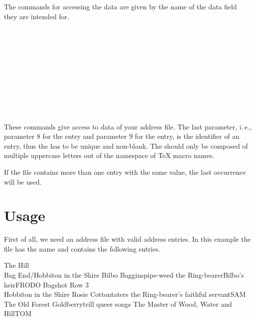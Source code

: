The commands for accessing the data are given by the name of the data
field they are intended for.
\begin{Declaration}
  \\
  \\
  \\
  \\
  \\
  \\
  \\
  \\
  \\
\end{Declaration}%
%
%
%
%
These commands give access to data of your address file.  The last
parameter, i.\,e., parameter 8 for the  entry and
parameter 9 for the  entry, is the identifier of an
entry, thus the  has to be unique and non-blank. The
 should only be composed of multiple uppercase letters out of the
namespace of \TeX{} macro names.

If the file contains more than one entry with the same 
value, the last occurrence will be used.%
%
%
%
%
%
%


\section{Usage}

First of all, we need an address file with valid address entries.  In
this example the file has the name  and contains the
following entries.
\begin{lstcode}
            {The Hill\\ Bag End/Hobbiton in the Shire}{}%
            {Bilbo Baggins}{pipe-weed}%
            {the Ring-bearer}{Bilbo's heir}{FRODO}
            {Bagshot Row 3\\Hobbiton in the Shire}{}%
            {Rosie Cotton}{taters}%
            {the Ring-bearer's faithful servant}{SAM}
            {The Old Forest}{}%
            {Goldberry}{trill queer songs}%
            {The Master of Wood, Water and Hill}{TOM}
\end{lstcode}

